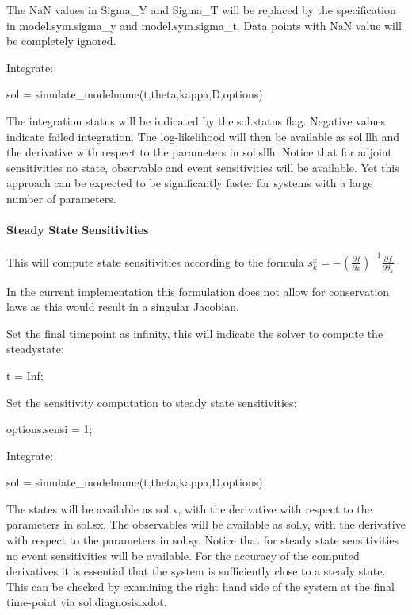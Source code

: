 The {\ttfamily NaN} values in {\ttfamily Sigma\+\_\+Y} and {\ttfamily Sigma\+\_\+T} will be replaced by the specification in {\ttfamily model.\+sym.\+sigma\+\_\+y} and {\ttfamily model.\+sym.\+sigma\+\_\+t}. Data points with {\ttfamily NaN} value will be completely ignored.

Integrate\+: \begin{DoxyVerb}sol = simulate_modelname(t,theta,kappa,D,options)
\end{DoxyVerb}


The integration status will be indicated by the sol.\+status flag. Negative values indicate failed integration. The log-\/likelihood will then be available as {\ttfamily sol.\+llh} and the derivative with respect to the parameters in {\ttfamily sol.\+sllh}. Notice that for adjoint sensitivities no state, observable and event sensitivities will be available. Yet this approach can be expected to be significantly faster for systems with a large number of parameters.

\paragraph*{Steady State Sensitivities}

This will compute state sensitivities according to the formula $ s_k^x = -\left(\frac{\partial f}{\partial x} \right)^{-1}\frac{\partial f}{\partial \theta_k} $

In the current implementation this formulation does not allow for conservation laws as this would result in a singular Jacobian.

Set the final timepoint as infinity, this will indicate the solver to compute the steadystate\+: \begin{DoxyVerb}t = Inf;
\end{DoxyVerb}


Set the sensitivity computation to steady state sensitivities\+: \begin{DoxyVerb}options.sensi = 1;
\end{DoxyVerb}


Integrate\+: \begin{DoxyVerb}sol = simulate_modelname(t,theta,kappa,D,options)
\end{DoxyVerb}


The states will be available as {\ttfamily sol.\+x}, with the derivative with respect to the parameters in {\ttfamily sol.\+sx}. The observables will be available as {\ttfamily sol.\+y}, with the derivative with respect to the parameters in {\ttfamily sol.\+sy}. Notice that for steady state sensitivities no event sensitivities will be available. For the accuracy of the computed derivatives it is essential that the system is sufficiently close to a steady state. This can be checked by examining the right hand side of the system at the final time-\/point via {\ttfamily sol.\+diagnosis.\+xdot}. 
